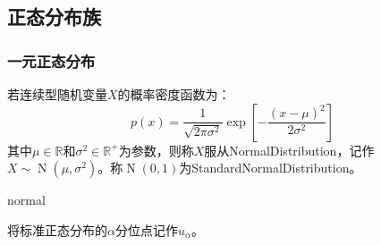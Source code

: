 \subsection{正态分布族}
\subsubsection{一元正态分布}
\begin{definition}
	若连续型随机变量$X$的概率密度函数为：
	\begin{equation*}
		p(x)=\frac{1}{\sqrt{2\pi\sigma^2}}\exp\left[-\frac{(x-\mu)^2}{2\sigma^2}\right]
	\end{equation*}
	其中$\mu\in\mathbb{R}$和$\sigma^2\in\mathbb{R}^{+}$为参数，则称$X$服从\gls{NormalDistribution}，记作$X\sim\operatorname{N}(\mu,\sigma^2)$。称$\operatorname{N}(0,1)$为\gls{StandardNormalDistribution}。
\end{definition}
\begin{densityplot}{normal}
	\caption{标准正态分布 $\operatorname{N}(0,1)$ 的概率密度函数}
\end{densityplot}
\begin{note}
	将标准正态分布的$\alpha$分位点记作$u_{\alpha}$。
\end{note}
